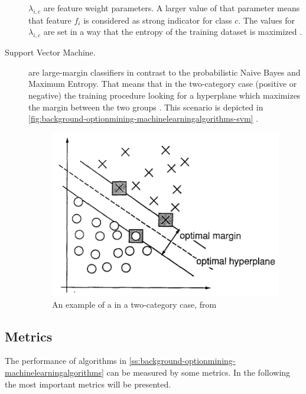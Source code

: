 \begin{description}
	$\lambda_{i,c}$ are feature weight parameters. A larger value of that parameter means that feature $f_i$ is considered as strong indicator for class $c$.
	The values for $\lambda_{i,c}$ are set in a way that the entropy of the training dataset is maximized \citep{Pang2002}.
		
	\item[Support Vector Machine.]
	\svm{} are large-margin classifiers in contrast to the probabilistic Naive Bayes and Maximum Entropy.
	That means that in the two-category case (positive or negative) the training procedure looking for a hyperplane which maximizes the margin between the two groups \citep{Pang2002}.
	This scenario is depicted in \autoref{fig:background-optionmining-machinelearningalgorithms-svm} \citep[p. 275]{Cortes1995}.
		
	\begin{figure}[ht]
		\centering
		\includegraphics[width=.7\textwidth]{images/svm.png}
		\caption[An example of a \svm{} in a two-category case]{An example of a \svm{} in a two-category case, from \citep[p. 275]{Cortes1995}}
		\label{fig:background-optionmining-machinelearningalgorithms-svm}
	\end{figure}
	
\end{description}

\subsection{Metrics}
\label{ss:background-optionmining-metrics}

The performance of algorithms in \cref{ss:background-optionmining-machinelearningalgorithms} can be measured by some metrics.
In the following the most important metrics will be presented.

